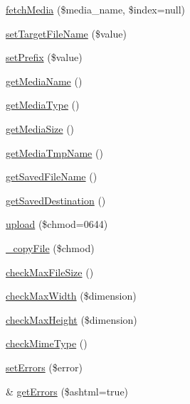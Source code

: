 \begin{DoxyCompactItemize}
\item 
\hyperlink{class_xoops_media_uploader_ad1dbaec1a315a6029fede8734dd24b70}{fetch\-Media} (\$media\-\_\-name, \$index=null)
\item 
\hyperlink{class_xoops_media_uploader_a8c8b456303f7a25f6a8c6a0b90c66a33}{set\-Target\-File\-Name} (\$value)
\item 
\hyperlink{class_xoops_media_uploader_a5ebb5eee91e4d2d671cd1657c92373e9}{set\-Prefix} (\$value)
\item 
\hyperlink{class_xoops_media_uploader_adbee91ac0dbb9f0aa122e91575a05327}{get\-Media\-Name} ()
\item 
\hyperlink{class_xoops_media_uploader_ae415e4abfc18ab4178c49953159e1233}{get\-Media\-Type} ()
\item 
\hyperlink{class_xoops_media_uploader_a35c2eb91d973a6aeef9d5d9911ae8bef}{get\-Media\-Size} ()
\item 
\hyperlink{class_xoops_media_uploader_a8cbf73083852cdf8af7b869b7609cf0a}{get\-Media\-Tmp\-Name} ()
\item 
\hyperlink{class_xoops_media_uploader_aadb0a65175d99f96b73d8e1df8875682}{get\-Saved\-File\-Name} ()
\item 
\hyperlink{class_xoops_media_uploader_a34505b2d173498c2ecd774b750de7605}{get\-Saved\-Destination} ()
\item 
\hyperlink{class_xoops_media_uploader_a6ade22bee6de9b13551d3e0b0d7c51e3}{upload} (\$chmod=0644)
\item 
\hyperlink{class_xoops_media_uploader_a78d56207e3942c1ca1bf7fec2cec6d00}{\-\_\-copy\-File} (\$chmod)
\item 
\hyperlink{class_xoops_media_uploader_a8984ff0beb438b73dfdc7ea035213aed}{check\-Max\-File\-Size} ()
\item 
\hyperlink{class_xoops_media_uploader_a981f6f84efb69a23a93ea27278c6913f}{check\-Max\-Width} (\$dimension)
\item 
\hyperlink{class_xoops_media_uploader_ab49dc954cbf9cf119b64f5628d15d42d}{check\-Max\-Height} (\$dimension)
\item 
\hyperlink{class_xoops_media_uploader_aceaef1e1bd2475a8ff3c79f6236f1a10}{check\-Mime\-Type} ()
\item 
\hyperlink{class_xoops_media_uploader_af4480e301c23de87249e79abc3676147}{set\-Errors} (\$error)
\item 
\& \hyperlink{class_xoops_media_uploader_aefb77c7229e1a4bf89b7c9e68b14cd1d}{get\-Errors} (\$ashtml=true)
\end{DoxyCompactItemize}
